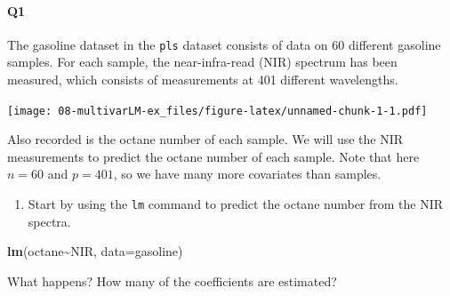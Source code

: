 \documentclass[
]{book}
\newenvironment{Shaded}{\begin{snugshade}}{\end{snugshade}}
\newcommand{\AttributeTok}[1]{\textcolor[rgb]{0.13,0.29,0.53}{#1}}
\newcommand{\DecValTok}[1]{\textcolor[rgb]{0.00,0.00,0.81}{#1}}
\newcommand{\FunctionTok}[1]{\textcolor[rgb]{0.13,0.29,0.53}{\textbf{#1}}}
\newcommand{\NormalTok}[1]{#1}
\newcommand{\SpecialCharTok}[1]{\textcolor[rgb]{0.81,0.36,0.00}{\textbf{#1}}}
\newcommand{\StringTok}[1]{\textcolor[rgb]{0.31,0.60,0.02}{#1}}
\providecommand{\tightlist}{%
  \setlength{\itemsep}{0pt}\setlength{\parskip}{0pt}}
\theoremstyle{definition}
\theoremstyle{definition}
\theoremstyle{definition}
\theoremstyle{definition}
\theoremstyle{remark}
\begin{document}
\paragraph*{Q1}\label{q1-1}

The gasoline dataset in the \texttt{pls} dataset consists of data on 60 different gasoline samples. For each sample, the near-infra-read (NIR) spectrum has been measured, which consists of measurements at 401 different wavelengths.

\begin{Shaded}
\end{Shaded}

\texttt{[image: 08-multivarLM-ex\_files/figure-latex/unnamed-chunk-1-1.pdf]}

Also recorded is the octane number of each sample. We will use the NIR measurements to predict the octane number of each sample.
Note that here \(n=60\) and \(p=401\), so we have many more covariates than samples.

\begin{enumerate}
\def\labelenumi{\roman{enumi}.}
\tightlist
\item
  Start by using the \texttt{lm} command to predict the octane number from the NIR spectra.
\end{enumerate}

\begin{Shaded}
\begin{Highlighting}[]
\FunctionTok{lm}\NormalTok{(octane}\SpecialCharTok{\textasciitilde{}}\NormalTok{NIR, }\AttributeTok{data=}\NormalTok{gasoline)}
\end{Highlighting}
\end{Shaded}

What happens? How many of the coefficients are estimated?
\end{document}
